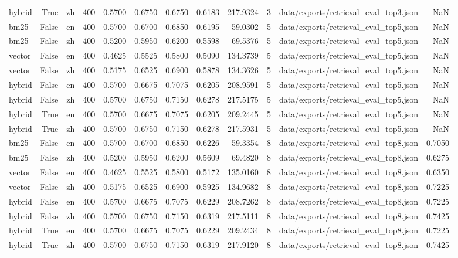 \begin{tabular}{lrlrrrrrrrlr}
hybrid & True & zh & 400 & 0.5700 & 0.6750 & 0.6750 & 0.6183 & 217.9324 & 3 & data/exports/retrieval_eval_top3.json & NaN \\
bm25 & False & en & 400 & 0.5700 & 0.6700 & 0.6850 & 0.6195 & 59.0302 & 5 & data/exports/retrieval_eval_top5.json & NaN \\
bm25 & False & zh & 400 & 0.5200 & 0.5950 & 0.6200 & 0.5598 & 69.5376 & 5 & data/exports/retrieval_eval_top5.json & NaN \\
vector & False & en & 400 & 0.4625 & 0.5525 & 0.5800 & 0.5090 & 134.3739 & 5 & data/exports/retrieval_eval_top5.json & NaN \\
vector & False & zh & 400 & 0.5175 & 0.6525 & 0.6900 & 0.5878 & 134.3626 & 5 & data/exports/retrieval_eval_top5.json & NaN \\
hybrid & False & en & 400 & 0.5700 & 0.6675 & 0.7075 & 0.6205 & 208.9591 & 5 & data/exports/retrieval_eval_top5.json & NaN \\
hybrid & False & zh & 400 & 0.5700 & 0.6750 & 0.7150 & 0.6278 & 217.5175 & 5 & data/exports/retrieval_eval_top5.json & NaN \\
hybrid & True & en & 400 & 0.5700 & 0.6675 & 0.7075 & 0.6205 & 209.2445 & 5 & data/exports/retrieval_eval_top5.json & NaN \\
hybrid & True & zh & 400 & 0.5700 & 0.6750 & 0.7150 & 0.6278 & 217.5931 & 5 & data/exports/retrieval_eval_top5.json & NaN \\
bm25 & False & en & 400 & 0.5700 & 0.6700 & 0.6850 & 0.6226 & 59.3354 & 8 & data/exports/retrieval_eval_top8.json & 0.7050 \\
bm25 & False & zh & 400 & 0.5200 & 0.5950 & 0.6200 & 0.5609 & 69.4820 & 8 & data/exports/retrieval_eval_top8.json & 0.6275 \\
vector & False & en & 400 & 0.4625 & 0.5525 & 0.5800 & 0.5172 & 135.0160 & 8 & data/exports/retrieval_eval_top8.json & 0.6350 \\
vector & False & zh & 400 & 0.5175 & 0.6525 & 0.6900 & 0.5925 & 134.9682 & 8 & data/exports/retrieval_eval_top8.json & 0.7225 \\
hybrid & False & en & 400 & 0.5700 & 0.6675 & 0.7075 & 0.6229 & 208.7262 & 8 & data/exports/retrieval_eval_top8.json & 0.7225 \\
hybrid & False & zh & 400 & 0.5700 & 0.6750 & 0.7150 & 0.6319 & 217.5111 & 8 & data/exports/retrieval_eval_top8.json & 0.7425 \\
hybrid & True & en & 400 & 0.5700 & 0.6675 & 0.7075 & 0.6229 & 209.2434 & 8 & data/exports/retrieval_eval_top8.json & 0.7225 \\
hybrid & True & zh & 400 & 0.5700 & 0.6750 & 0.7150 & 0.6319 & 217.9120 & 8 & data/exports/retrieval_eval_top8.json & 0.7425 \\
\bottomrule
\end{tabular}
